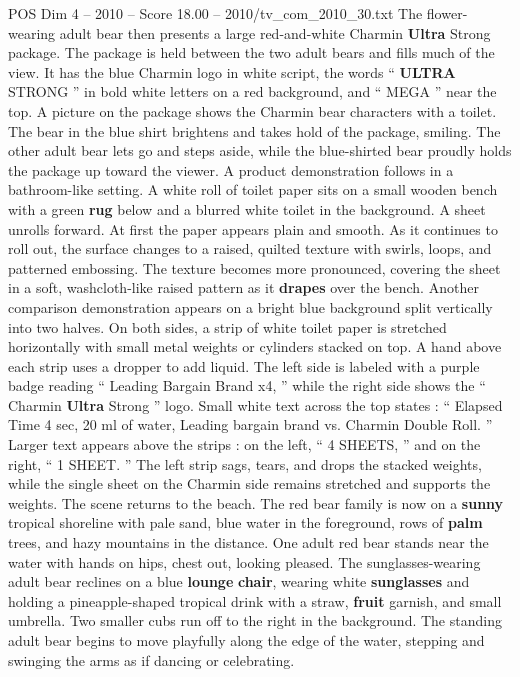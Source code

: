 \begin{textsample}{POS Dim 4 – 2010 – Score 18.00 – 2010/tv\_com\_2010\_30.txt}
The flower-wearing adult bear then presents a large red-and-white Charmin \textbf{Ultra} Strong package.
The package is held between the two adult bears and fills much of the view.
It has the blue Charmin logo in white script, the words “ \textbf{ULTRA} STRONG ” in bold white letters on a red background, and “ MEGA ” near the top.
A picture on the package shows the Charmin bear characters with a toilet.
The bear in the blue shirt brightens and takes hold of the package, smiling.
The other adult bear lets go and steps aside, while the blue-shirted bear proudly holds the package up toward the viewer.
A product demonstration follows in a bathroom-like setting.
A white roll of toilet paper sits on a small wooden bench with a green \textbf{rug} below and a blurred white toilet in the background.
A sheet unrolls forward.
At first the paper appears plain and smooth.
As it continues to roll out, the surface changes to a raised, quilted texture with swirls, loops, and patterned embossing.
The texture becomes more pronounced, covering the sheet in a soft, washcloth-like raised pattern as it \textbf{drapes} over the bench.
Another comparison demonstration appears on a bright blue background split vertically into two halves.
On both sides, a strip of white toilet paper is stretched horizontally with small metal weights or cylinders stacked on top.
A hand above each strip uses a dropper to add liquid.
The left side is labeled with a purple badge reading “ Leading Bargain Brand x4, ” while the right side shows the “ Charmin \textbf{Ultra} Strong ” logo.
Small white text across the top states : “ Elapsed Time 4 sec, 20 ml of water, Leading bargain brand vs.
Charmin Double Roll. ” Larger text appears above the strips : on the left, “ 4 SHEETS, ” and on the right, “ 1 SHEET. ” The left strip sags, tears, and drops the stacked weights, while the single sheet on the Charmin side remains stretched and supports the weights.
The scene returns to the beach.
The red bear family is now on a \textbf{sunny} tropical shoreline with pale sand, blue water in the foreground, rows of \textbf{palm} trees, and hazy mountains in the distance.
One adult red bear stands near the water with hands on hips, chest out, looking pleased.
The sunglasses-wearing adult bear reclines on a blue \textbf{lounge} \textbf{chair}, wearing white \textbf{sunglasses} and holding a pineapple-shaped tropical drink with a straw, \textbf{fruit} garnish, and small umbrella.
Two smaller cubs run off to the right in the background.
The standing adult bear begins to move playfully along the edge of the water, stepping and swinging the arms as if dancing or celebrating.

\end{textsample}

